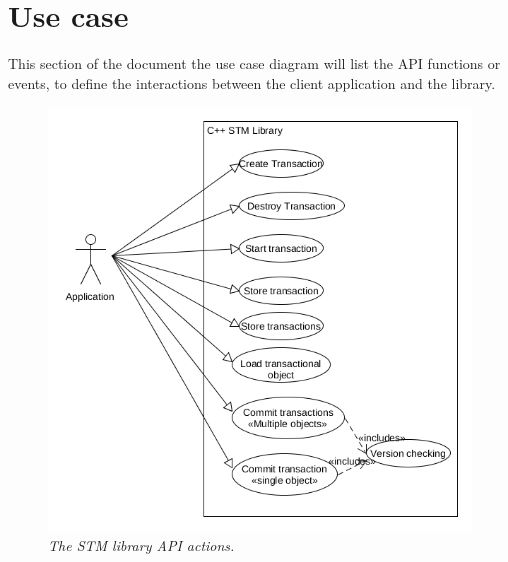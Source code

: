 \documentclass[12pt]{article}
\begin{document}
\newpage
\section{Use case}
This section of the document the use case diagram will list the API functions or events, to define the interactions between the client application and the library.

\begin{figure}[h!]
\centering
\includegraphics[scale=0.35]{Pictures/usecase.png}
\caption{\textit{\color{gray}The STM library API actions.}}
\end{figure}
\end{document}
